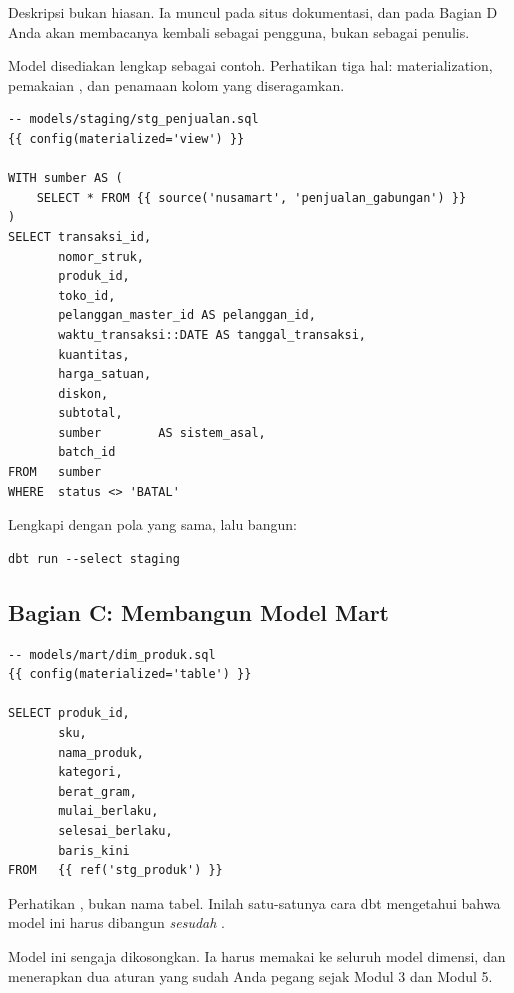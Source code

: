 Deskripsi bukan hiasan. Ia muncul pada situs dokumentasi, dan pada Bagian D
Anda akan membacanya kembali sebagai pengguna, bukan sebagai penulis.


Model  disediakan lengkap sebagai contoh. Perhatikan
tiga hal:  materialization, pemakaian , dan
penamaan kolom yang diseragamkan.

\begin{lstlisting}[style=sqlgaya]
-- models/staging/stg_penjualan.sql
{{ config(materialized='view') }}

WITH sumber AS (
    SELECT * FROM {{ source('nusamart', 'penjualan_gabungan') }}
)
SELECT transaksi_id,
       nomor_struk,
       produk_id,
       toko_id,
       pelanggan_master_id AS pelanggan_id,
       waktu_transaksi::DATE AS tanggal_transaksi,
       kuantitas,
       harga_satuan,
       diskon,
       subtotal,
       sumber        AS sistem_asal,
       batch_id
FROM   sumber
WHERE  status <> 'BATAL'
\end{lstlisting}

Lengkapi  dengan pola yang sama, lalu bangun:

\begin{lstlisting}[style=shellgaya]
dbt run --select staging
\end{lstlisting}

\subsection{Bagian C: Membangun Model Mart}


\begin{lstlisting}[style=sqlgaya]
-- models/mart/dim_produk.sql
{{ config(materialized='table') }}

SELECT produk_id,
       sku,
       nama_produk,
       kategori,
       berat_gram,
       mulai_berlaku,
       selesai_berlaku,
       baris_kini
FROM   {{ ref('stg_produk') }}
\end{lstlisting}

Perhatikan , bukan nama tabel. Inilah satu-satunya cara dbt
mengetahui bahwa model ini harus dibangun \emph{sesudah}
.


Model ini sengaja dikosongkan. Ia harus memakai  ke seluruh
model dimensi, dan menerapkan dua aturan yang sudah Anda pegang sejak Modul 3
dan Modul 5.

